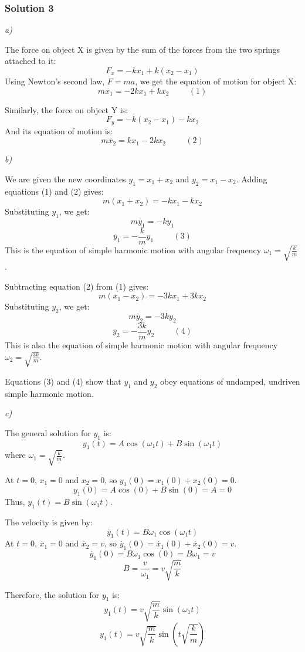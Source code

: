 \documentclass{article}
\begin{document}
\subsubsection{Solution 3}
\textit{a)}

The force on object X is given by the sum of the forces from the two springs attached to it:
\[F_x = -kx_1 + k(x_2 - x_1)\]
Using Newton's second law, $F = ma$, we get the equation of motion for object X:
\[m\ddot{x_1} = -2kx_1 + kx_2 \hspace{1cm} (1) \]

Similarly, the force on object Y is:
\[F_y = -k(x_2 - x_1) - kx_2\]
And its equation of motion is:
\[m\ddot{x_2} = kx_1 - 2kx_2 \hspace{1cm} (2)\]

\textit{b)}

We are given the new coordinates $y_1 = x_1 + x_2$ and $y_2 = x_1 - x_2$.
Adding equations (1) and (2) gives:
\[m(\ddot{x_1} + \ddot{x_2}) = -kx_1 - kx_2\]
Substituting $y_1$, we get:
\[m\ddot{y_1} = -ky_1\]
\[\ddot{y_1} = -\frac{k}{m}y_1 \hspace{1cm} (3)\]
This is the equation of simple harmonic motion with angular frequency $\omega_1 = \sqrt{\frac{k}{m}}$.

Subtracting equation (2) from (1) gives:
\[m(\ddot{x_1} - \ddot{x_2}) = -3kx_1 + 3kx_2\]
Substituting $y_2$, we get:
\[m\ddot{y_2} = -3ky_2\]
\[\ddot{y_2} = -\frac{3k}{m}y_2 \hspace{1cm} (4)\]
This is also the equation of simple harmonic motion with angular frequency $\omega_2 = \sqrt{\frac{3k}{m}}$.

Equations (3) and (4) show that $y_1$ and $y_2$ obey equations of undamped, undriven simple harmonic motion.

\textit{c)}

The general solution for $y_1$ is:
\[y_1(t) = A\cos(\omega_1 t) + B\sin(\omega_1 t)\]
where $\omega_1 = \sqrt{\frac{k}{m}}$.

At $t=0$, $x_1 = 0$ and $x_2 = 0$, so $y_1(0) = x_1(0) + x_2(0) = 0$.
\[y_1(0) = A\cos(0) + B\sin(0) = A = 0\]
Thus, $y_1(t) = B\sin(\omega_1 t)$.

The velocity is given by:
\[\dot{y_1}(t) = B\omega_1\cos(\omega_1 t)\]
At $t=0$, $\dot{x_1} = 0$ and $\dot{x_2} = v$, so $\dot{y_1}(0) = \dot{x_1}(0) + \dot{x_2}(0) = v$.
\[\dot{y_1}(0) = B\omega_1\cos(0) = B\omega_1 = v\]
\[B = \frac{v}{\omega_1} = v\sqrt{\frac{m}{k}}\]

Therefore, the solution for $y_1$ is:
\[y_1(t) = v\sqrt{\frac{m}{k}}\sin(\omega_1 t)\]
\[y_1(t) = v\sqrt{\frac{m}{k}}\sin(t\sqrt{\frac{k}{m}})\]
\end{document}
